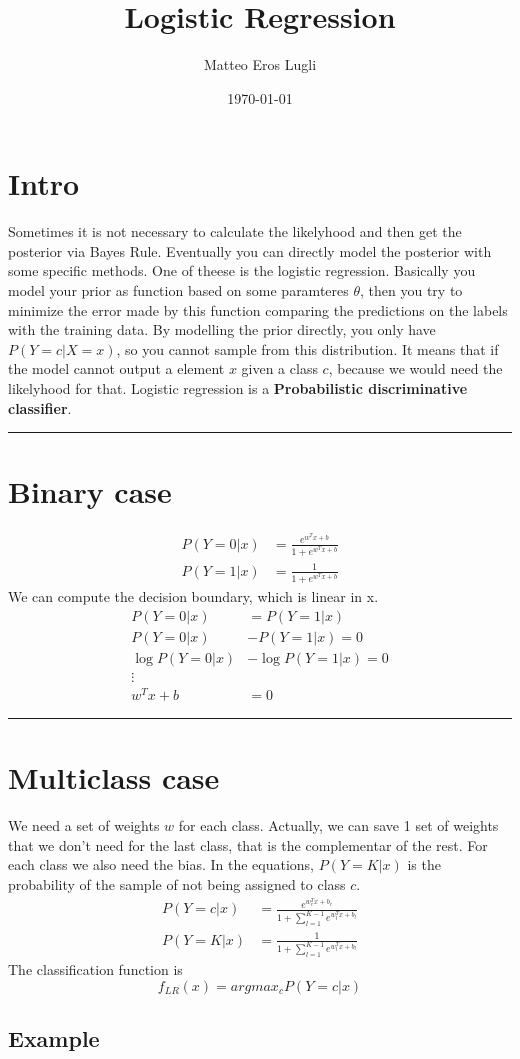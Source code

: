 \documentclass[11pt]{article}
\author{Matteo Eros Lugli}
\date{\today}
\title{\textbf{Logistic Regression}}
\begin{document}
\maketitle
\tableofcontents

\section{Intro}
\label{sec:org8d7d2e6}
Sometimes it is not necessary to calculate the likelyhood and then get the posterior via Bayes Rule.
Eventually you can directly model the posterior with some specific methods. One of theese is the
logistic regression. Basically you model your prior as function based on some paramteres \(\theta\), 
then you try to minimize the error made by this function comparing the predictions on the 
labels with the training data.
By modelling the prior directly, you only have \(P(Y=c|X=x)\), so you cannot sample from this distribution.
It means that if the model cannot output a element \(x\) given a class \(c\), because we would need the 
likelyhood for that. Logistic regression is a \textbf{Probabilistic discriminative classifier}.

\noindent\rule{\textwidth}{0.5pt}
\section{Binary case}
\label{sec:orgcdb2b19}
\begin{align}
P(Y=0|x) &= \frac{e^{w^{T}x + b}}{1+e^{w^{T}x + b}} \\
P(Y=1|x) &= \frac{1}{1+e^{w^{T}x + b}}
\end{align}
We can compute the decision boundary, which is linear in x.
\begin{align}
P(Y=0|x) &= P(Y=1|x) \\
P(Y=0|x) &- P(Y=1|x) = 0 \\
\log{P(Y=0|x)} &- \log{P(Y=1|x)} = 0\\
\vdots \\
w^{T}x+b &= 0
\end{align}

\noindent\rule{\textwidth}{0.5pt}
\section{Multiclass case}
\label{sec:org48e2290}
We need a set of weights \(w\) for each class. Actually, we can save 1 set of weights that we
don't need for the last class, that is the complementar of the rest.
For each class we also need the bias. In the equations, \(P(Y=K|x)\) is the probability of the
sample of not being assigned to class \(c\).
\begin{align}
P(Y=c|x) &= \frac{e^{w_{c}^{T}x + b_{c}}}{1+\sum_{l=1}^{K-1}e^{w_{l}^{T}x + b_{l}}} \\
P(Y=K|x) &= \frac{1}{1+\sum_{l=1}^{K-1}e^{w_{l}^{T}x + b_{l}}}
\end{align}
The classification function is
\begin{equation}
f_{LR}(x) = argmax_{c}P(Y=c|x)
\end{equation}
\subsection{Example}
\label{sec:orgd22ddb6}
\end{document}
